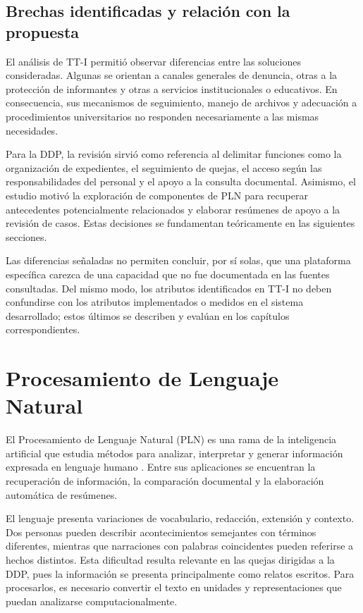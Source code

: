 \subsection{Brechas identificadas y relación con la propuesta}

El análisis de TT-I permitió observar diferencias entre las soluciones consideradas. Algunas se orientan a canales generales de denuncia, otras a la protección de informantes y otras a servicios institucionales o educativos. En consecuencia, sus mecanismos de seguimiento, manejo de archivos y adecuación a procedimientos universitarios no responden necesariamente a las mismas necesidades.

Para la DDP, la revisión sirvió como referencia al delimitar funciones como la organización de expedientes, el seguimiento de quejas, el acceso según las responsabilidades del personal y el apoyo a la consulta documental. Asimismo, el estudio motivó la exploración de componentes de PLN para recuperar antecedentes potencialmente relacionados y elaborar resúmenes de apoyo a la revisión de casos. Estas decisiones se fundamentan teóricamente en las siguientes secciones.

Las diferencias señaladas no permiten concluir, por sí solas, que una plataforma específica carezca de una capacidad que no fue documentada en las fuentes consultadas. Del mismo modo, los atributos identificados en TT-I no deben confundirse con los atributos implementados o medidos en el sistema desarrollado; estos últimos se describen y evalúan en los capítulos correspondientes.

\section{Procesamiento de Lenguaje Natural}
\label{sec:fundamentos_pln}

El Procesamiento de Lenguaje Natural (PLN) es una rama de la inteligencia artificial que estudia métodos para analizar, interpretar y generar información expresada en lenguaje humano \cite{jurafsky2023slp}. Entre sus aplicaciones se encuentran la recuperación de información, la comparación documental y la elaboración automática de resúmenes.

El lenguaje presenta variaciones de vocabulario, redacción, extensión y contexto. Dos personas pueden describir acontecimientos semejantes con términos diferentes, mientras que narraciones con palabras coincidentes pueden referirse a hechos distintos. Esta dificultad resulta relevante en las quejas dirigidas a la DDP, pues la información se presenta principalmente como relatos escritos. Para procesarlos, es necesario convertir el texto en unidades y representaciones que puedan analizarse computacionalmente.


